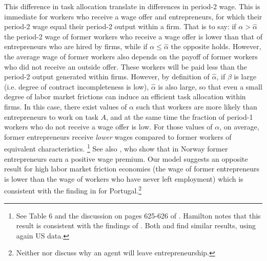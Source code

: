 \documentclass[12pt,american]{paper}
\theoremstyle{remark}
\begin{document}
This difference in task allocation translate in differences in period-2 wage. This is immediate for workers who receive a wage offer and entrepreneurs, for which their period-2 wage equal their period-2 output within a firm. That is to say: if $\alpha>\hat \alpha$ the period-2 wage of former workers who receive a wage offer is lower than that of entrepreneurs who are hired by firms, while if $\alpha\leq \hat \alpha$ the opposite holds. However, the average wage of former workers also depends on the payoff of former workers who did not receive an outside offer. These workers will be paid less than the period-2 output generated within firms. However, by definition of $\hat \alpha$,   if $\beta$ is large (i.e. degree of contract incompleteness is low), $\hat \alpha$ is also large, so that even a small degree of labor market frictions can induce an efficient task allocation within firms. In this case, there exist values of $\alpha$ such that workers are more likely than entrepreneurs to work on task $A$, and at the same time the fraction of period-1 workers who do not receive a wage offer is low. For those values of $\alpha$, on average, former entrepreneurs  receive \textit{lower} wages compared to former workers of equivalent characteristics.
% 
\footnote{See Table 6 and the discussion on pages 625-626 of \cite{hamilton2000does}. Hamilton notes that this result is consistent with the findings of \cite{evans1990}.  Both  \cite{daly2015long} and \cite{Hincapie2020} find similar results, using again US data.} See also \cite{luzzi2016individual}, who show that in Norway former entrepreneurs earn a positive wage premium.  Our model suggests an opposite result for high labor market friction economies (the wage of former entrepreneurs is lower than the wage of workers who have never left employment) which is consistent with the finding in \citet*{baptista2012former} for Portugal.\footnote{Neither \citet{hamilton2000does} nor \citet*{baptista2012former} discuss why an agent will leave entrepreneurship.}

\end{document}

